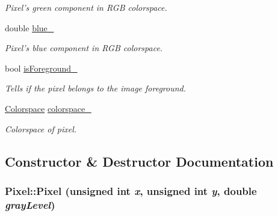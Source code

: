 \begin{CompactItemize}
\begin{CompactList}\small\item\em Pixel's green component in RGB colorspace. \item\end{CompactList}\item 
\hypertarget{class_pixel_9d2375a06d09fafc8390a89c0a9397b4}{
double \hyperlink{class_pixel_9d2375a06d09fafc8390a89c0a9397b4}{blue\_\-}}
\label{class_pixel_9d2375a06d09fafc8390a89c0a9397b4}

\begin{CompactList}\small\item\em Pixel's blue component in RGB colorspace. \item\end{CompactList}\item 
\hypertarget{class_pixel_c5e23dca7ce110bd906966dedf975fca}{
bool \hyperlink{class_pixel_c5e23dca7ce110bd906966dedf975fca}{isForeground\_\-}}
\label{class_pixel_c5e23dca7ce110bd906966dedf975fca}

\begin{CompactList}\small\item\em Tells if the pixel belongs to the image foreground. \item\end{CompactList}\item 
\hypertarget{class_pixel_df7d066dd31f59039561b541e29aa217}{
\hyperlink{_colorspace_8h_7a7e24cdb2a27271343f0adceff89f65}{Colorspace} \hyperlink{class_pixel_df7d066dd31f59039561b541e29aa217}{colorspace\_\-}}
\label{class_pixel_df7d066dd31f59039561b541e29aa217}

\begin{CompactList}\small\item\em Colorspace of pixel. \item\end{CompactList}\end{CompactItemize}


\subsection{Constructor \& Destructor Documentation}
\hypertarget{class_pixel_dfa33daefa83d3ac471af91fb32f8997}{
\subsubsection[Pixel]{\setlength{\rightskip}{0pt plus 5cm}Pixel::Pixel (unsigned int {\em x}, \/  unsigned int {\em y}, \/  double {\em grayLevel})}}
\label{class_pixel_dfa33daefa83d3ac471af91fb32f8997}


